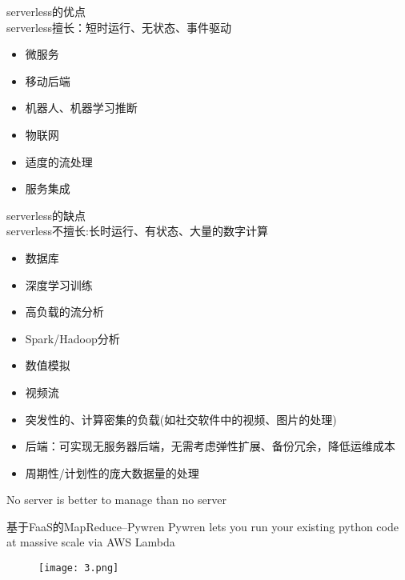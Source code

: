 \documentclass{beamer}
\begin{document}
    \begin{frame}serverless的优点\\
        serverless擅长：短时运行、无状态、事件驱动
        \begin{itemize}
        	\item 微服务
        	\item 移动后端
        	\item 机器人、机器学习推断
        	\item 物联网
        	\item 适度的流处理
        	\item 服务集成
        \end{itemize}        
    \end{frame}

    \begin{frame}serverless的缺点\\
        serverless不擅长:长时运行、有状态、大量的数字计算
       \begin{itemize}
       	\item 数据库
       	\item 深度学习训练
       	\item 高负载的流分析
       	\item Spark/Hadoop分析
       	\item 数值模拟
       	\item 视频流
       \end{itemize}
        
    \end{frame}

    \begin{frame}
    	\begin{itemize}
    		\item 突发性的、计算密集的负载(如社交软件中的视频、图片的处理)
    		\item 后端：可实现无服务器后端，无需考虑弹性扩展、备份冗余，降低运维成本
    		\item 周期性/计划性的庞大数据量的处理
    		
    	\end{itemize}
        No server is better to manage than no server
    \end{frame}

    \begin{frame}基于FaaS的MapReduce--Pywren
        Pywren lets you run your existing python code at massive scale via AWS Lambda
        \begin{figure}
        	\centering
        	\texttt{[image: 3.png]}
        \end{figure}
    \end{frame}
\end{document}
